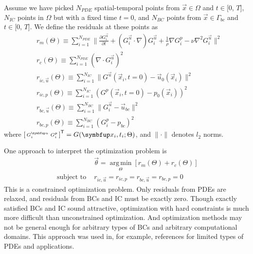 Assume we have picked $N_{PDE}$ spatial-temporal points from $\vec{x}\in\Omega$ and $t\in[0$, $T]$, $N_{IC}$ points in $\Omega$ but with a fixed time $t=0$, and $N_{BC}$ points from $\vec{x} \in \Gamma_{bc}$ and $t\in[0$, $T]$.
We define the residuals at these points as \\
\begin{equation}\label{eq:residual-norms}
    \begin{aligned}
        & r_{m}(\Theta) \equiv \sum\limits_{i=1}^{N_{PDE}} \lVert\frac{\partial G_i^{\vec{u}}}{\partial t}+(G_i^{\vec{u}} \cdot \nabla) G_i^{\vec{u}}+\frac{1}{\rho} \nabla G_i^p -\nu \nabla^{2} G_i^{\vec{u}} \rVert^2 \\
        & r_{c}(\Theta) \equiv \sum\limits_{i=1}^{N_{PDE}} ( \nabla \cdot G_i^{\vec{u}} )^2 \\
        & r_{ic,\vec{u}}(\Theta) \equiv \sum\limits_{i=1}^{N_{IC}} \lVert G^{\vec{u}}(\vec{x}_i, t=0)-\vec{u}_0(\vec{x}_i) \rVert^2 \\
        & r_{ic,p}(\Theta) \equiv \sum\limits_{i=1}^{N_{IC}} ( G^{p}(\vec{x}_i, t=0)-p_0(\vec{x}_i) )^2 \\
        & r_{bc,\vec{u}}(\Theta) \equiv \sum\limits_{i=1}^{N_{BC}} \lVert G_i^{\vec{u}}-\vec{u}_{bc} \rVert^2 \\
        & r_{bc,p}(\Theta) \equiv \sum\limits_{i=1}^{N_{BC}} ( G_i^{p}-p_{bc} )^2
   \end{aligned}
\end{equation}
where $\begin{bsmallmatrix}G_i^{\vec{u}} & G_i^p\end{bsmallmatrix}^\mathsf{T} = G(\vec{x}_i, t_i; \Theta)$, and $\lVert\cdot\rVert$ denotes $l_2$ norms.

One approach to interpret the optimization problem is
\begin{equation}\label{eq:hard-constraint-loss}
    \begin{aligned}
    &\vec{\theta} = \operatorname*{arg\,min}\limits_{\Theta} \left[r_m(\Theta) + r_c(\Theta)\right] \\
    \text{ subject to } &r_{ic,\vec{u}}=r_{ic,p}=r_{bc,\vec{u}}=r_{bc,p}=0
    \end{aligned}
\end{equation}
This is a constrained optimization problem.
Only residuals from PDEs are relaxed, and residuals from BCs and IC must be exactly zero.
Though exactly satisfied BCs and IC sound attractive, optimization with hard constraints is much more difficult than unconstrained optimization.
And optimization methods may not be general enough for arbitrary types of BCs and arbitrary computational domains.
This approach was used in, for example, references \cite{lagaris_artificial_1998,McFall2009,mcfall_solving_2010,berg_unified_2018} for limited types of PDEs and applications.

